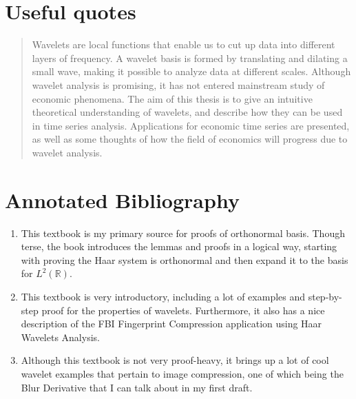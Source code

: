 \documentclass[11pt]{amsart}
\theoremstyle{theorem} %
\theoremstyle{definition}
\theoremstyle{example}
\theoremstyle{remark}
\numberwithin{equation}{section}
\newcommand{\R}{\mathbb{R}}
\begin{document}
\section{Useful quotes}
\begin{quote}
	Wavelets are local functions that enable us to cut up data into different layers of frequency. A wavelet basis is formed by translating and dilating a small wave, making it
	possible to analyze data at different scales. Although wavelet analysis is promising, it
	has not entered mainstream study of economic phenomena. The aim of this thesis is to
	give an intuitive theoretical understanding of wavelets, and describe how they can be
	used in time series analysis. Applications for economic time series are presented, as well
	as some thoughts of how the field of economics will progress due to wavelet analysis.
\end{quote}


\section{Annotated Bibliography}
\begin{enumerate}
	\item {}
	
	\smallskip
	This textbook is my primary source for proofs of orthonormal basis. Though terse, the book introduces the lemmas and proofs in a logical way, starting with proving the Haar system is orthonormal and then expand it to the basis for $L^2(\R)$.
	
	\item {}
	
	\smallskip
	This textbook is very introductory, including a lot of examples and step-by-step proof for the properties of wavelets. Furthermore, it also has a nice description of the FBI Fingerprint Compression application using Haar Wavelets Analysis.	
	
	\item {}
	
	\smallskip
	Although this textbook is not very proof-heavy, it brings up a lot of cool wavelet examples that pertain to image compression, one of which being the Blur Derivative that I can talk about in my first draft.
\end{enumerate}	
	
\end{document}
